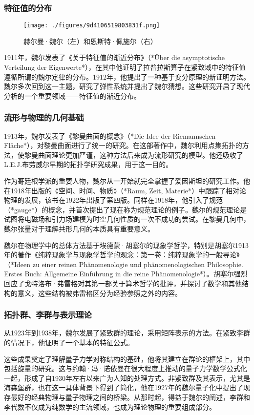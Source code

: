\subsubsection{特征值的分布 } 
\begin{figure}[ht]
\centering
\texttt{[image: ./figures/9d4106519803831f.png]}
\caption{赫尔曼·魏尔（左）和恩斯特·佩施尔（右）} \label{fig_WR_2}
\end{figure}
1911年，魏尔发表了《关于特征值的渐近分布》（*Über die asymptotische Verteilung der Eigenwerte*），在其中他证明了拉普拉斯算子在紧致域中的特征值遵循所谓的魏尔定律的分布。1912年，他提出了一种基于变分原理的新证明方法。魏尔多次回到这一主题，研究了弹性系统并提出了魏尔猜想。这些研究开启了现代分析的一个重要领域——特征值的渐近分布。
\subsubsection{流形与物理的几何基础}
1913年，魏尔发表了《黎曼曲面的概念》（*Die Idee der Riemannschen Fläche*），对黎曼曲面进行了统一的研究。在这部著作中，魏尔利用点集拓扑的方法，使黎曼曲面理论更加严谨，这种方法后来成为流形研究的模型。他还吸收了L.E.J.布劳威尔早期的拓扑学研究成果，用于这一目的。  

作为哥廷根学派的重要人物，魏尔从一开始就完全掌握了爱因斯坦的研究工作。他在1918年出版的《空间、时间、物质》（*Raum, Zeit, Materie*）中跟踪了相对论物理的发展，该书在1922年出版了第四版。同样在1918年，他引入了规范（*gauge*）的概念，并首次提出了现在称为规范理论的例子。魏尔的规范理论是试图将电磁场和引力场建模为时空几何性质的一次不成功的尝试。在黎曼几何中，魏尔张量对于理解共形几何的本质具有重要意义。  

魏尔在物理学中的总体方法基于埃德蒙·胡塞尔的现象学哲学，特别是胡塞尔1913年的著作《纯粹现象学与现象学哲学的观念：第一卷：纯粹现象学的一般导论》（*Ideen zu einer reinen Phänomenologie und phänomenologischen Philosophie. Erstes Buch: Allgemeine Einführung in die reine Phänomenologie*）。胡塞尔强烈回应了戈特洛布·弗雷格对其第一部关于算术哲学的批评，并探讨了数学和其他结构的意义，这些结构被弗雷格区分为经验参照之外的内容。
\subsubsection{拓扑群、李群与表示理论}
从1923年到1938年，魏尔发展了紧致群的理论，采用矩阵表示的方法。在紧致李群的情况下，他证明了一个基本的特征公式。  

这些成果奠定了理解量子力学对称结构的基础，他将其建立在群论的框架上，其中包括旋量的研究。这与约翰·冯·诺依曼在很大程度上推动的量子力学数学公式化一起，形成了自1930年左右以来广为人知的处理方式。非紧致群及其表示，尤其是海森堡群，也在这一具体背景下得到了简化，他在1927年的魏尔量子化中提出了现存最好的经典物理与量子物理之间的桥梁。从那时起，得益于魏尔的阐述，李群和李代数不仅成为纯数学的主流领域，也成为理论物理的重要组成部分。  

